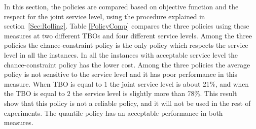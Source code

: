 \documentclass[10pt]{article}
\begin{document}
In this section, the policies are compared based on objective function and the respect for the joint service level, using the procedure explained in section~\ref{Sec:Rolling}. Table \ref{PolicyComp} compares the three policies using these measures at two different TBOs and four different service levels. Among the three policies the chance-constraint policy is the only policy which respects the service level in all the instances. In all the instances with acceptable service level the chance-constraint policy has the lower cost. Among the three policies the average policy is not sensitive to the service level and it has poor performance in this measure. When TBO is equal to 1 the joint service level is about 21\%, and when the TBO is equal to 2 the service level is slightly more than 78\%. This result show that this policy is not a reliable policy, and it will not be used in the rest of experiments. The quantile policy has an acceptable performance in both measures. 


\newcommand{\nm}[1]{\textnormal{#1}}
\end{document}
